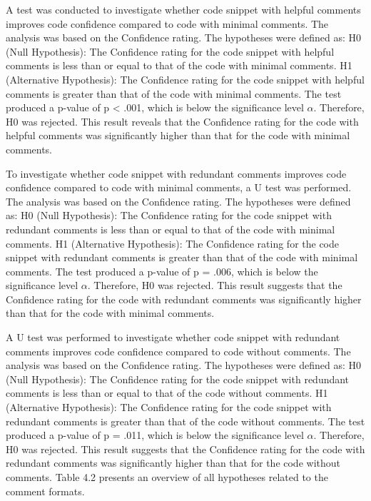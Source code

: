 A test was conducted to investigate whether code snippet with helpful comments improves code confidence compared to code with minimal comments. The analysis was based on the Confidence rating. The hypotheses were defined as:  H0 (Null Hypothesis): The Confidence rating for the code snippet with helpful comments is less than or equal to that of the code with minimal comments.  H1 (Alternative Hypothesis): The Confidence rating for the code snippet with helpful comments is greater than that of the code with minimal comments. The test produced a p-value of   p < .001, which is below the significance level $\alpha$. Therefore, H0 was rejected.  This result reveals that the Confidence rating  for the code with helpful comments was significantly higher than that for the code with minimal comments.  


To investigate whether code snippet with redundant comments improves code confidence compared to code with minimal comments, a U test was performed. The analysis was based on the Confidence rating. The hypotheses were defined as:  H0 (Null Hypothesis): The Confidence rating for the code snippet with redundant comments is less than or equal to that of the code with minimal comments.  H1 (Alternative Hypothesis): The Confidence rating for the code snippet with redundant comments is greater than that of the code with minimal comments.      
The test produced a p-value of  p = .006, which is below the significance level $\alpha $. Therefore, H0 was rejected.  This result suggests that the Confidence rating  for the code with redundant comments was significantly higher than that for the code with minimal comments.   


A U test was performed to investigate whether code snippet with redundant comments improves code confidence compared to code without comments. The analysis was based on the Confidence rating. The hypotheses were defined as:  H0 (Null Hypothesis): The Confidence rating for the code snippet with redundant comments is less than or equal to that of the code without comments.  H1 (Alternative Hypothesis): The Confidence rating for the code snippet with redundant comments is greater than that of the code without comments.      
The test produced a p-value of  p = .011, which is below the significance level $\alpha $. Therefore, H0 was rejected.  This result suggests that the Confidence rating  for the code with redundant comments was significantly higher than that for the code without comments.   Table 4.2 presents an overview of all hypotheses related to the comment formats.

